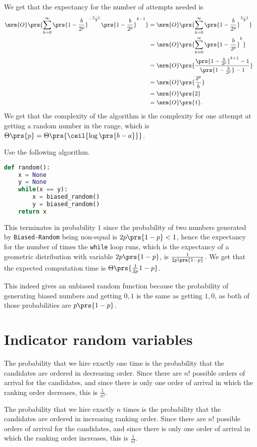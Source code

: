 \documentclass[oneside]{scrbook}
\newcommand{\codeword}[1]{\texttt{#1}}
\theoremstyle{definition}
\begin{document}
\begin{exercise}
We get that the expectancy for the number of attempts needed is
\begin{align*}
\mrm{O}\prs{\sum_{k=0}^{\infty} \prs{1 - \frac{b}{2^p}}^{- \frac{k-1}{2}} \prs{1 - \frac{b}{2^p}}^{k-1}}
&=
\mrm{O} \prs{\sum_{k=0}^{\infty} \prs{1 - \frac{b}{2^p}}^{\frac{k-1}{2}}}
\\&=
\mrm{O}\prs{\sum_{k=0}^{\infty} \prs{1 - \frac{b}{2^p}}^k}
\\&=
\mrm{O}\prs{\frac{\prs{1 - \frac{b}{2^p}}^{k+1} - 1}{\prs{1 - \frac{b}{2^p}} - 1}}
\\&=
\mrm{O}\prs{\frac{2^p}{b}}
\\&=
\mrm{O}\prs{2}
\\&=
\mrm{O}\prs{1} \text{.}
\end{align*}
We get that the complexity of the algorithm is the complexity for one attempt at getting a random number in the range, which is $\Theta\prs{p} = \Theta\prs{\ceil{\log \prs{b - a}}}$.
\end{exercise}

\begin{exercise}
Use the following algorithm.
\begin{lstlisting}[language=Python]
def random():
	x = None
	y = None
	while(x == y):
		x = biased_random()
		y = biased_random()
	return x
\end{lstlisting}

This terminates in probability $1$ since the probability of two numbers generated by \codeword{Biased-Random} being non-equal is $2 p \prs{1-p} < 1$, hence the expectancy for the number of times the \codeword{while} loop runs, which is the expectancy of a geometric distribution with variable $2 p \prs{1-p}$, is $\frac{1}{2 p \prs{1-p}}$.
We get that the expected computation time is $\Theta\prs{\frac{1}{2 p}{1 - p}}$.

This indeed gives an unbiased random function because the probability of generating biased numbers and getting $0,1$ is the same as getting $1,0$, as both of those probabilities are $p\prs{1-p}$.
\end{exercise}

\section{Indicator random variables}

\begin{exercise}
The probability that we hire exactly one time is the probability that the candidates are ordered in decreasing order. Since there are $n!$ possible orders of arrival for the candidates, and since there is only one order of arrival in which the ranking order decreases, this is $\frac{1}{n!}$.

The probability that we hire exactly $n$ times is the probability that the candidates are ordered in increasing ranking order. Since there are $n!$ possible orders of arrival for the candidates, and since there is only one order of arrival in which the ranking order increases, this is $\frac{1}{n!}$.
\end{exercise}
\end{document}

